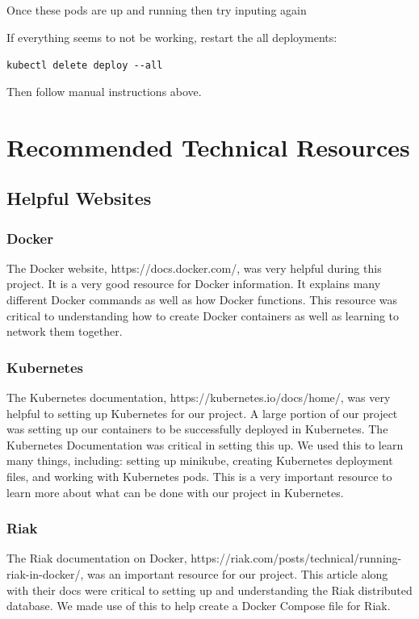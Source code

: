 \documentclass[onecolumn, draftclsnofoot,10pt, compsoc]{IEEEtran}
\begin{document}
Once these pods are up and running then try inputing again

If everything seems to not be working, restart the all deployments:

\texttt{kubectl\ delete\ deploy\ -\/-all}

Then follow manual instructions above.




\section{Recommended Technical Resources}

\subsection{Helpful Websites}
\subsubsection{Docker}
The Docker website, https://docs.docker.com/, was very helpful during this project. It is a very good resource for Docker information. It explains many different Docker commands as well as how Docker functions. This resource was critical to understanding how to create Docker containers as well as learning to network them together. 
\subsubsection{Kubernetes}
The Kubernetes documentation, https://kubernetes.io/docs/home/, was very helpful to setting up Kubernetes for our project. A large portion of our project was setting up our containers to be successfully deployed in Kubernetes. The Kubernetes Documentation was critical in setting this up. We used this to learn many things, including: setting up minikube, creating Kubernetes deployment files, and working with Kubernetes pods. This is a very important resource to learn more about what can be done with our project in Kubernetes.
\subsubsection{Riak}
The Riak documentation on Docker, https://riak.com/posts/technical/running-riak-in-docker/, was an important resource for our project. This article along with their docs were critical to setting up and understanding the Riak distributed database. We made use of this to help create a Docker Compose file for Riak. 
\end{document}
